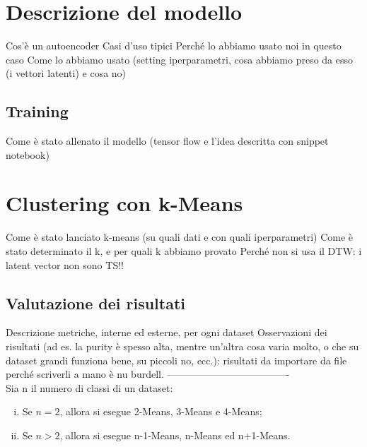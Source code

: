 \section{Descrizione del modello}
Cos'è un autoencoder
Casi d'uso tipici
Perché lo abbiamo usato noi in questo caso
Come lo abbiamo usato (setting iperparametri, cosa abbiamo preso da esso (i vettori latenti) e cosa no)

\subsection{Training}
Come è stato allenato il modello (tensor flow e l'idea descritta con snippet notebook)

\section{Clustering con k-Means}
Come è stato lanciato k-means (su quali dati e con quali iperparametri)
Come è stato determinato il k, e per quali k abbiamo provato
Perché non si usa il DTW: i latent vector non sono TS!!

\subsection{Valutazione dei risultati}
Descrizione metriche, interne ed esterne, per ogni dataset
Osservazioni dei risultati (ad es. la purity è spesso alta, mentre un'altra cosa varia molto, o che su dataset grandi funziona bene, su piccoli no, ecc.): risultati da importare da file perché scriverli a mano è nu burdell.
-------------------------------------\\

Sia n il numero di classi di un dataset:
\begin{enumerate}[(i)]
	\item Se $n=2$, allora si esegue 2-Means, 3-Means e 4-Means;
	\item Se $n>2$, allora si esegue n-1-Means, n-Means ed n+1-Means.
\end{enumerate}

